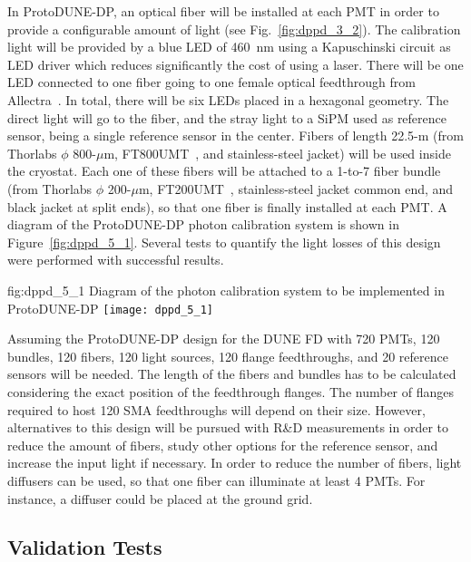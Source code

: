 In ProtoDUNE-DP, an optical fiber will be installed at each PMT in order to provide a configurable amount of light (see Fig.~\ref{fig:dppd_3_2}). The calibration light will be provided by a blue LED of \SI{460}{nm} using a Kapuschinski circuit as LED driver which reduces significantly the cost of using a laser. There will be one LED connected to one fiber going to one female optical feedthrough from Allectra~\cite{allectra}. In total,  there will be six LEDs placed in a hexagonal geometry. The direct light will go to the fiber, and the stray light to a SiPM used as reference sensor, being a single reference sensor in the center. Fibers of length 22.5-m (from Thorlabs $\phi$ 800-$\mu$m, FT800UMT~\cite{ft800umt}, and stainless-steel jacket) will be used inside the cryostat. Each one of these fibers will be attached to a 1-to-7 fiber bundle (from Thorlabs $\phi$ 200-$\mu$m, FT200UMT~\cite{ft200umt}, stainless-steel jacket common end, and black jacket at split ends), so that one fiber is finally installed at each PMT. A diagram of the ProtoDUNE-DP photon calibration system is shown in Figure~\ref{fig:dppd_5_1}. Several tests to quantify the light losses of this design were performed with successful results. 

\begin{dunefigure}{fig:dppd_5_1}
{Diagram of the photon calibration system to be implemented in ProtoDUNE-DP}
\texttt{[image: dppd\_5\_1]}
\end{dunefigure}

Assuming the ProtoDUNE-DP design for the DUNE FD with \num{720} PMTs, \num{120} bundles, \num{120} fibers, \num{120} light sources, \num{120} flange feedthroughs, and \num{20} reference sensors will be needed. The length of the fibers and bundles has to be calculated considering the exact position of the feedthrough flanges. The number of flanges required to host \num{120} SMA feedthroughs will depend on their size. However, alternatives to this design will be pursued with R\&D measurements in order to reduce the amount of fibers, study other options for the reference sensor, and increase the input light if necessary. In order to reduce the number of fibers, light diffusers can be used, so that one fiber can illuminate at least \num{4} PMTs. For instance, a diffuser could be placed at the ground grid. 

\subsection{Validation Tests}
\label{sec:fddp-pd-5.2}

